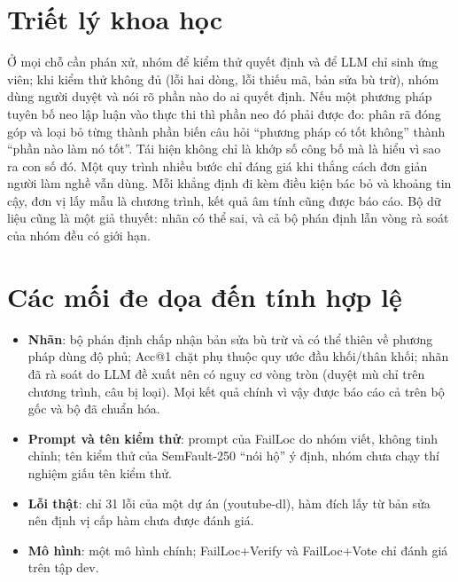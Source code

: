 \section{Triết lý khoa học}
\label{sec:triet-ly}

Ở mọi chỗ cần phán xử, nhóm để kiểm thử quyết định và để LLM chỉ sinh ứng viên; khi kiểm thử không đủ (lỗi hai dòng, lỗi
thiếu mã, bản sửa bù trừ), nhóm dùng người duyệt và nói rõ phần nào do ai quyết định. Nếu một phương pháp tuyên bố neo lập
luận vào thực thi thì phần neo đó phải được đo: phân rã đóng góp và loại bỏ từng thành phần biến câu hỏi ``phương pháp có
tốt không'' thành ``phần nào làm nó tốt''. Tái hiện không chỉ là khớp số công bố mà là hiểu vì sao ra con số đó. Một quy
trình nhiều bước chỉ đáng giá khi thắng cách đơn giản người làm nghề vẫn dùng. Mỗi khẳng định đi kèm điều kiện bác bỏ và
khoảng tin cậy, đơn vị lấy mẫu là chương trình, kết quả âm tính cũng được báo cáo. Bộ dữ liệu cũng là một giả thuyết: nhãn
có thể sai, và cả bộ phán định lẫn vòng rà soát của nhóm đều có giới hạn.

\section{Các mối đe dọa đến tính hợp lệ}
\label{sec:moi-de-doa}

\begin{itemize}
\item \textbf{Nhãn}: bộ phán định chấp nhận bản sửa bù trừ và có thể thiên về phương pháp dùng độ phủ; Acc@1 chặt phụ thuộc
  quy ước đầu khối/thân khối; nhãn đã rà soát do LLM đề xuất nên có nguy cơ vòng tròn (duyệt mù chỉ trên
  \BlindBlindAllPrograms{} chương trình, \BlindAnswersExcluded{} câu bị loại). Mọi kết quả chính vì vậy được báo cáo cả
  trên bộ gốc và bộ đã chuẩn hóa.
\item \textbf{Prompt và tên kiểm thử}: prompt của FailLoc do nhóm viết, không tinh chỉnh; tên kiểm thử của SemFault-250
  ``nói hộ'' ý định, nhóm chưa chạy thí nghiệm giấu tên kiểm thử.
\item \textbf{Lỗi thật}: chỉ 31 lỗi của một dự án (youtube-dl), hàm đích lấy từ bản sửa nên định vị cấp hàm chưa được đánh giá.
\item \textbf{Mô hình}: một mô hình chính; FailLoc+Verify và FailLoc+Vote chỉ đánh giá trên tập dev.
\end{itemize}
